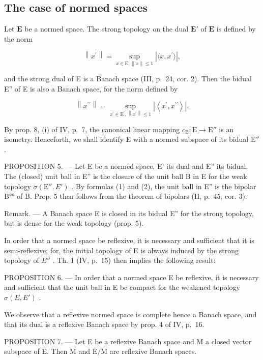 \subsection{The case of normed spaces}

Let \(\mathbf{E}\) be a normed space. The strong topology on the dual \(\mathbf{E}'\) of \(\mathbf{E}\) is defined by the norm

\[
\left\| x ^ {\prime} \right\| = \sup _ {x \in \mathrm{E}, \| x \| \leqslant 1} \left| \langle x, x ^ {\prime} \rangle \right|,\tag{1}
\]

and the strong dual of E is a Banach space (III, p.~24, cor. 2). Then the bidual E'' of E is also a Banach space, for the norm defined by

\[
\left\| x ^ {\prime \prime} \right\| = \sup _ {x ^ {\prime} \in \mathrm{E} ^ {\prime}, \left\| x ^ {\prime} \right\| \leqslant 1} \left| \left\langle x ^ {\prime}, x ^ {\prime \prime} \right\rangle \right|.\tag{2}
\]

By prop. 8, (i) of IV, p.~7, the canonical linear mapping \(c_{\mathrm{E}}: \mathrm{E} \to \mathrm{E}''\) is an isometry. Henceforth, we shall identify E with a normed subspace of its bidual \(\mathrm{E}''\) .

PROPOSITION 5. --- Let E be a normed space, E' its dual and E'' its bidual. The (closed) unit ball in E'' is the closure of the unit ball B in E for the weak topology \(\sigma(\mathrm{E}'', E')\) . By formulas (1) and (2), the unit ball in E'' is the bipolar B°° of B. Prop. 5 then follows from the theorem of bipolars (II, p.~45, cor. 3).

Remark. --- A Banach space E is closed in its bidual E'' for the strong topology, but is dense for the weak topology (prop. 5).

In order that a normed space be reflexive, it is necessary and sufficient that it is semi-reflexive; for, the initial topology of E is always induced by the strong topology of \(E''\) . Th. 1 (IV, p.~15) then implies the following result:

PROPOSITION 6. --- In order that a normed space E be reflexive, it is necessary and sufficient that the unit ball in E be compact for the weakened topology \(\sigma(E, E')\) .

We observe that a reflexive normed space is complete hence a Banach space, and that its dual is a reflexive Banach space by prop. 4 of IV, p.~16.

PROPOSITION 7. --- Let E be a reflexive Banach space and M a closed vector subspace of E. Then M and E/M are reflexive Banach spaces.

